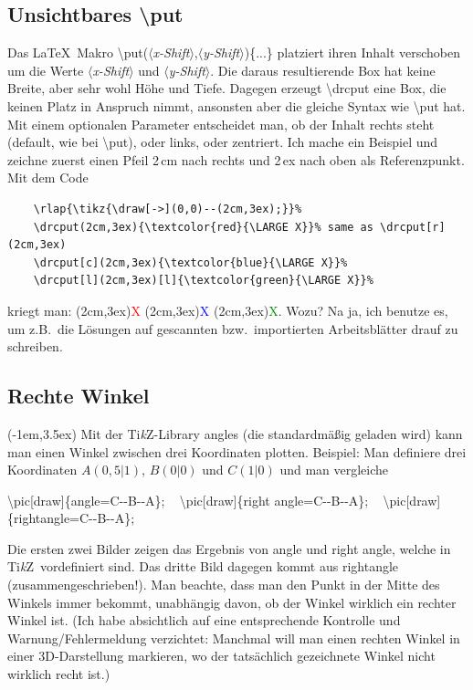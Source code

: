 \documentclass[hyperworksheet,pgfplots]{drcschool}
\makeatletter
\newcommand*{\cs}[1]{\textup{\ttfamily\textbackslash#1}}                   %
\newcommand*{\opt}[1]{\textup{\ttfamily#1}}                                %
\newcommand*{\param}[1]{\mbox{\normalfont$\langle$\textit{#1}$\rangle$}}   %
\newcommand*{\TikZ}{\textup{Ti\textit{k}Z}}                                %
\newcommand*{\onlytikz}{%
   \textcolor{red}{%
      \vtop{%
         \vbox{%
            \vss                                                           %
            \hrule height\p@                                               %
            \kern2\p@                                                      %
            \hbox{\normalfont\normalsize! \TikZ\ !}%
         }%
         \kern2\p@                                                         %
         \hrule height\p@                                                  %
      }%
   }%
}                                                                          %
\makeatother
\begin{document}
\subsection{Unsichtbares \cs{put}}
Das LaTeX\ Makro \cs{put(\param{x-Shift},\param{y-Shift})\{...\}} platziert ihren
Inhalt verschoben um die Werte \param{x-Shift} und \param{y-Shift}. Die
daraus resultierende Box hat keine Breite, aber sehr wohl Höhe und Tiefe.
Dagegen erzeugt \cs{drcput} eine Box, die keinen Platz in Anspruch nimmt, ansonsten
aber die gleiche Syntax wie \cs{put} hat. Mit einem optionalen Parameter
entscheidet man, ob der Inhalt rechts steht (default, wie bei \cs{put}), oder links,
oder zentriert. Ich mache ein Beispiel und zeichne zuerst einen Pfeil 2\,cm nach rechts
und 2\,ex nach oben als Referenzpunkt. Mit dem Code
\begin{verbatim}
    \rlap{\tikz{\draw[->](0,0)--(2cm,3ex);}}%
    \drcput(2cm,3ex){\textcolor{red}{\LARGE X}}% same as \drcput[r](2cm,3ex)
    \drcput[c](2cm,3ex){\textcolor{blue}{\LARGE X}}%
    \drcput[l](2cm,3ex)[l]{\textcolor{green}{\LARGE X}}%
\end{verbatim}
kriegt man:
\drcput(2cm,3ex){\textcolor{red}{\LARGE X}}
\drcput[c](2cm,3ex){\textcolor{blue}{\LARGE X}}
\drcput[l](2cm,3ex){\textcolor{green}{\LARGE X}}.
Wozu? Na ja, ich benutze es, um z.B.~die Lösungen auf gescannten bzw.~importierten
Arbeitsblätter drauf zu schreiben.

\subsection{Rechte Winkel}
\leavevmode\drcput[l](-1em,3.5ex){\onlytikz}
Mit der \TikZ-Library \opt{angles} (die standardmäßig geladen wird) kann man einen Winkel
zwischen drei Koordinaten plotten. Beispiel: Man definiere drei
Koordinaten $A(0,5|1)$, $B(0|0)$ und $C(1|0)$ und man vergleiche
\begin{center}
\cs{pic[draw]\{angle=C-{}-B-{}-A\};} \textrightarrow\ \qquad
\cs{pic[draw]\{right angle=C-{}-B-{}-A\};} \textrightarrow\ \qquad
\cs{pic[draw]\{rightangle=C-{}-B-{}-A\};} \textrightarrow\ \qquad
\end{center}
Die ersten zwei Bilder zeigen das Ergebnis von \opt{angle} und \opt{right angle},
welche in \TikZ\ vordefiniert sind. Das dritte Bild dagegen kommt
aus \opt{rightangle} (zusammengeschrieben!). Man beachte, dass man den Punkt in der Mitte
des Winkels immer bekommt, unabhängig davon, ob der Winkel wirklich ein rechter Winkel ist.
(Ich habe absichtlich auf eine entsprechende Kontrolle und Warnung/Fehlermeldung verzichtet:
Manchmal will man einen rechten Winkel in einer 3D-Darstellung markieren, wo der
tatsächlich gezeichnete Winkel nicht wirklich recht ist.)
\end{document}
